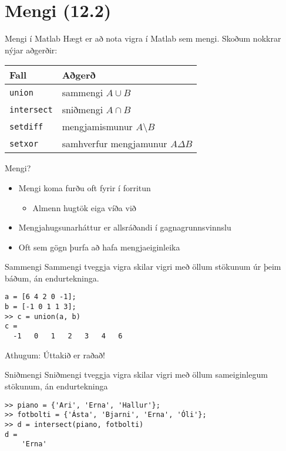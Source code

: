 \documentclass{beamer}
\begin{document}
\section{Mengi (12.2)}

\begin{frame}{Mengi í Matlab}
Hægt er að nota vigra í Matlab sem mengi. Skoðum nokkrar nýjar aðgerðir:
\begin{center}
\begin{tabular}{ll}
\toprule
Fall&Aðgerð\\
\midrule
\texttt{union}&sammengi $A \cup B$\\
\texttt{intersect}&sniðmengi $A \cap B$\\
\texttt{setdiff}&mengjamismunur $ A \setminus B$\\
\texttt{setxor}&samhverfur mengjamunur $A \Delta B$\\
\bottomrule
\end{tabular}
\end{center}
\end{frame}

\begin{frame}{Mengi?}
\begin{itemize}
 \item Mengi koma furðu oft fyrir í forritun
 \begin{itemize}
  \item Almenn hugtök eiga víða við
 \end{itemize}
 \item Mengjahugsunarháttur er allsráðandi í gagnagrunnsvinnslu
 \item Oft sem gögn þurfa að hafa mengjaeiginleika
\end{itemize}
\end{frame}


\begin{frame}[fragile]{Sammengi}
Sammengi tveggja vigra skilar vigri með öllum stökunum úr þeim báðum, án endurtekninga.
\begin{verbatim}
a = [6 4 2 0 -1];
b = [-1 0 1 1 3];
>> c = union(a, b)
c =
  -1   0   1   2   3   4   6
\end{verbatim}
Athugum: Úttakið er raðað!
\end{frame}

\begin{frame}[fragile]{Sniðmengi}
Sniðmengi tveggja vigra skilar vigri með öllum sameiginlegum stökunum, án endurtekninga
\begin{verbatim}
>> piano = {'Ari', 'Erna', 'Hallur'};
>> fotbolti = {'Ásta', 'Bjarni', 'Erna', 'Óli'};
>> d = intersect(piano, fotbolti)
d = 
    'Erna'
\end{verbatim}
\end{frame}
\end{document}
